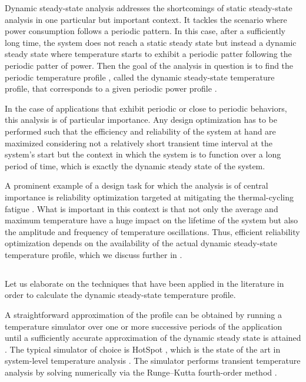 Dynamic steady-state analysis addresses the shortcomings of static steady-state
analysis in one particular but important context. It tackles the scenario where
power consumption follows a periodic pattern. In this case, after a sufficiently
long time, the system does not reach a static steady state but instead a dynamic
steady state where temperature starts to exhibit a periodic patter following the
periodic patter of power. Then the goal of the analysis in question is to find
the periodic temperature profile \mq, called the dynamic steady-state
temperature profile, that corresponds to a given periodic power profile \mp.

In the case of applications that exhibit periodic or close to periodic
behaviors, this analysis is of particular importance. Any design optimization
has to be performed such that the efficiency and reliability of the system at
hand are maximized considering not a relatively short transient time interval at
the system's start but the context in which the system is to function over a
long period of time, which is exactly the dynamic steady state of the system.

A prominent example of a design task for which the analysis is of central
importance is reliability optimization targeted at mitigating the
thermal-cycling fatigue \cite{jedec2016}. What is important in this context is
that not only the average and maximum temperature have a huge impact on the
lifetime of the system but also the amplitude and frequency of temperature
oscillations. Thus, efficient reliability optimization depends on the
availability of the actual dynamic steady-state temperature profile, which we
discuss further in .

\subsection{\priortitle}

Let us elaborate on the techniques that have been applied in the literature in
order to calculate the dynamic steady-state temperature profile.

A straightforward approximation of the profile can be obtained by running a
temperature simulator over one or more successive periods of the application
until a sufficiently accurate approximation of the dynamic steady state is
attained \cite{srinivasan2004}. The typical simulator of choice is HotSpot
\cite{skadron2003}, which is the state of the art in system-level temperature
analysis \cite{srinivasan2004, liao2005, coskun2006, liu2007, huang2009b,
xiang2010, thiele2011}. The simulator performs transient temperature analysis by
solving  numerically via the Runge--Kutta
fourth-order method \cite{press2007}.

